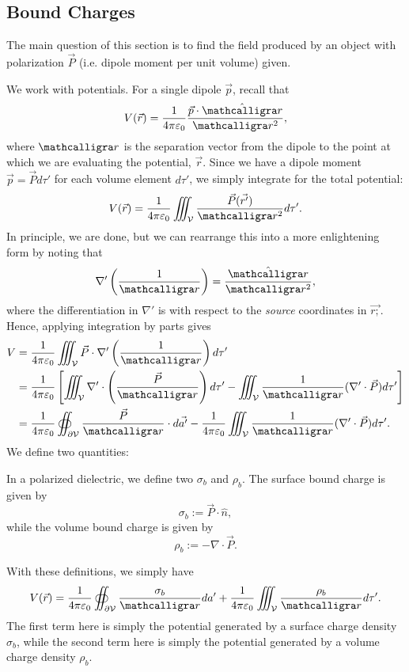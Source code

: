 \subsection{Bound Charges}

The main question of this section is to find the field produced by an object with polarization $\vec{P}$ (i.e. dipole moment per unit volume) given.

We work with potentials. For a single dipole $\vec{p}$, recall that
\[V(\vec{r})=\frac{1}{4\pi\varepsilon_0}\frac{\vec{p}\cdot\hat{\scr}}{\scr^2},\]
where $\scr$ is the separation vector from the dipole to the point at which we are evaluating the potential, $\vec{r}$. Since we have a dipole moment $\vec{p}=\vec{P}d\tau'$ for each volume element $d\tau'$, we simply integrate for the total potential:
\[V(\vec{r})=\frac{1}{4\pi\varepsilon_0}\iiint_{\mathcal{V}}\frac{\vec{P}(\vec{r'})}{\scr^2}d\tau'.\]
In principle, we are done, but we can rearrange this into a more enlightening form by noting that
\[\nabla'\left(\frac{1}{\scr}\right)=\frac{\hat{\scr}}{\scr^2},\]
where the differentiation in $\nabla'$ is with respect to the \textit{source} coordinates in $\vec{r;}$. Hence, applying integration by parts gives
\begin{align*}
    V&=\frac{1}{4\pi\varepsilon_0}\iiint_{\mathcal{V}}\vec{P}\cdot \nabla'\left(\frac{1}{\scr}\right)d\tau'\\
    &=\frac{1}{4\pi\varepsilon_0}\left[\iiint_{\mathcal{V}}\nabla'\cdot\left(\frac{\vec{P}}{\scr}\right)d\tau'-\iiint_{\mathcal{V}}\frac{1}{\scr}(\nabla'\cdot \vec{P})d\tau'\right]\\
    &=\frac{1}{4\pi\varepsilon_0}\oiint_{\partial\mathcal{V}}\frac{\vec{P}}{\scr}\cdot d\vec{a'}-\frac{1}{4\pi\varepsilon_0}\iiint_{\mathcal{V}}\frac{1}{\scr}(\nabla'\cdot \vec{P})d\tau'.
\end{align*}
We define two quantities:
\begin{definition}
In a polarized dielectric, we define two  $\sigma_b$ and $\rho_b$. The surface bound charge is given by
\[\sigma_b:=\vec{P}\cdot \hat{n},\]
while the volume bound charge is given by
\[\rho_b:=-\nabla\cdot\vec{P}.\]
\end{definition}

With these definitions, we simply have
\[V(\vec{r})=\frac{1}{4\pi\varepsilon_0}\oiint_{\partial\mathcal{V}}\frac{\sigma_b}{\scr}da'+\frac{1}{4\pi\varepsilon_0}\iiint_{\mathcal{V}}\frac{\rho_b}{\scr}d\tau'.\]
The first term here is simply the potential generated by a surface charge density $\sigma_b$, while the second term here is simply the potential generated by a volume charge density $\rho_b$.

